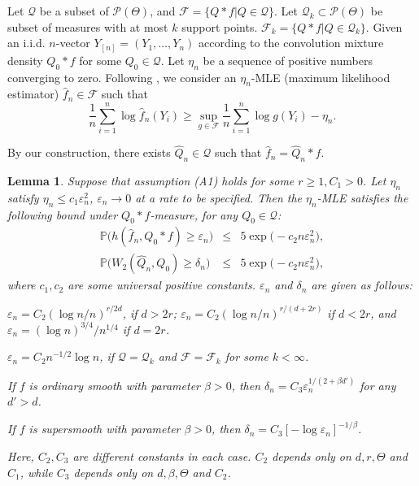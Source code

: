 \documentclass[MSNbibl,number,citesort]{arxbj}
\newtheorem{lemma}{Lemma}[section]
\newcommand{\Fcal}{\mathcal{F}}
\newcommand{\Pcal}{\mathscr{P}}
\newcommand{\Qcal}{\mathcal{Q}}
\newcommand{\Prob}{\mathbb{P}}
\newcommand{\hatQ}{\hat{Q}}
\newcommand{\hatf}{\hat{f}}
\newcommand{\YYn}{Y_{[n]}}
\begin{document}
Let $\Qcal$ be a subset of $\Pcal(\Theta)$, and $\Fcal= \{Q*f | Q
\in
\Qcal\}$.
Let $\Qcal_k \subset\Pcal(\Theta)$ be subset of measures with at
most $k$
support points. $\Fcal_k = \{Q*f | Q \in\Qcal_k\}$.
Given an i.i.d. $n$-vector $\YYn= (Y_1,\ldots, Y_n)$ according
to the convolution mixture density $Q_0*f$ for some $Q_0 \in\Qcal$.
Let $\eta_n$ be a sequence
of positive numbers converging to zero. Following \cite{Wong-Shen-95},
we consider
an $\eta_n$-MLE (maximum likelihood estimator) $\hatf_n \in\Fcal$
such that
%
\[
\frac{1}{n}\sum_{i=1}^{n} \log
\hatf_n(Y_i) \geq\sup_{g \in\Fcal}
\frac{1}{n} \sum_{i=1}^{n}\log
g(Y_i) - \eta_n.
\]

By our construction, there exists $\hatQ_n \in\Qcal$ such that
$\hatf_n = \hatQ_n*f$.

%
\begin{lemma}
\label{Lem-wong-shen}
Suppose that assumption \textup{(A1)} holds for some $r\geq1, C_1 > 0$. Let $\eta
_n$ satisfy
$\eta_n \leq c_1\varepsilon_n^2$, $\varepsilon_n \rightarrow0$ at a
rate to
be specified.
Then the $\eta_n$-MLE satisfies
the following bound under $Q_0*f$-measure, for any $Q_0 \in\Qcal$:
%
%
\begin{eqnarray}
\Prob \bigl(h(\hatf_n,Q_0*f) \geq\varepsilon_n
\bigr) & \leq& 5\exp \bigl(-c_2n\varepsilon_n^2
\bigr),
\\
\label{Eqn-deconvolution} \Prob \bigl(W_2(\hatQ_n,Q_0)
\geq\delta_n \bigr) & \leq& 5\exp \bigl(-c_2n
\varepsilon_n^2 \bigr),
\end{eqnarray}
%
where $c_1,c_2$ are some universal positive constants. $\varepsilon_n$ and
$\delta_n$
are given as follows:
%
\begin{longlist}[(a)]
%
\item[(a)] $\varepsilon_n = C_2(\log n/n)^{r/2d}$, if $d > 2r$;
$\varepsilon_n = C_2(\log n/n)^{r/(d+2r)}$ if $d<2r$, and
$\varepsilon_n =  (\log n)^{3/4}/n^{1/4}$ if $d=2r$.
%
\item[(b)] $\varepsilon_n = C_2 n^{-1/2}\log n$, if $\Qcal= \Qcal_k$
and $\Fcal= \Fcal_k$ for some $k < \infty$.
%
\item[(c)] If $f$
is ordinary smooth with parameter $\beta> 0$,
then $\delta_n = C_3 \varepsilon_n^{{1}/{(2+\beta d')}}$ for any
$d' > d$.
%
\item[(d)] If $f$
is supersmooth with parameter $\beta> 0$, then
$\delta_n = C_3 [-\log\varepsilon_n]^{-1/\beta}$.
\end{longlist}
%
Here, $C_2,C_3$ are different constants in each case. $C_2$
depends only on $d,r,\Theta$ and $C_1$, while $C_3$ depends only on
$d,\beta, \Theta$ and $C_2$.
\end{lemma}
\end{document}
